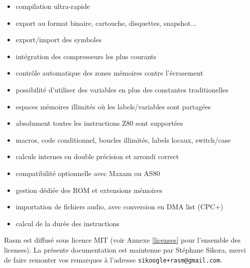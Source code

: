 \begin{xfr}
\begin{itemize}[noitemsep]
\item compilation ultra-rapide
\item export au format binaire, cartouche, disquettes, snapshot...
\item export/import des symboles
\item intégration des compresseurs les plus courants
\item contrôle automatique des zones mémoires contre l'écrasement
\item possibilité d'utiliser des variables en plus des constantes traditionelles
\item espaces mémoires illimités où les labels/variables sont partagées
\item absolument toutes les instructions Z80 sont supportées
\item macros, code conditionnel, boucles illimités, labels locaux, switch/case
\item calculs internes en double précision et arrondi correct
\item compatibilité optionnelle avec Maxam ou AS80
\item gestion dédiée des ROM et extensions mémoires
\item importation de fichiers audio, avec conversion en DMA list (CPC+)
\item calcul de la durée des instructions
\end{itemize}
\medbreak
Rasm est diffusé sous licence MIT (voir Annexe \ref{licenses} pour l'ensemble des licenses).
\medbreak
La présente documentation est maintenue par Stéphane Sikora, merci de faire remonter vos remarques à l'adresse \texttt{sikoogle+rasm@gmail.com}.
\end{xfr}

